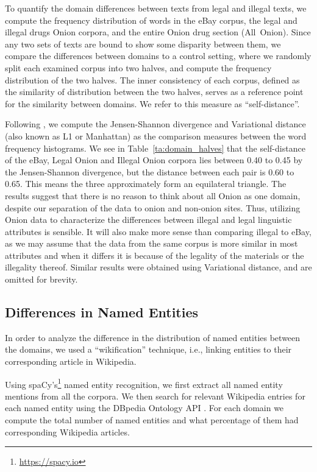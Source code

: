 \documentclass[11pt,a4paper,table]{article}
\begin{document}
    To quantify the domain differences between texts from legal and illegal texts,
    we compute the frequency distribution of words in the eBay corpus, the legal and illegal drugs Onion corpora, and the entire Onion drug section (All~Onion). 
    Since any two sets of texts are bound to show some disparity between them, we compare the differences between domains to a control setting, where we randomly split each examined corpus into two halves, and compute the frequency distribution of the two halves.
    The inner consistency of each corpus, defined as the similarity of distribution between the two halves, serves as a reference point for the similarity between domains.
    We refer to this measure as ``self-distance''.
    
    Following \citet{Plank2011EffectiveMO}, we compute the Jensen-Shannon divergence and Variational distance (also known as L1 or Manhattan) as the comparison measures between the word frequency histograms.
    We see in Table~\ref{ta:domain_halves} that the self-distance of the
    eBay, Legal Onion and Illegal Onion corpora lies between 0.40 to 0.45
    by the Jensen-Shannon divergence, but the distance between each pair
    is 0.60 to 0.65. 
    This means the three approximately form an equilateral triangle. 
    The results suggest that there is no reason to think about all Onion as one domain, despite our separation of the data to onion and non-onion sites. Thus, utilizing Onion data to characterize the differences between illegal and legal linguistic attributes is sensible. It will also make more sense than comparing illegal to eBay, as we may assume that the data from the same corpus is more similar in most attributes and when it differs it is because of the legality of the materials or the illegality thereof.
    Similar results were obtained using Variational distance, and are omitted for brevity.

\subsection{Differences in Named Entities}

    In order to analyze the difference in the distribution of 
    named entities between the domains,  we used a ``wikification''\cite{bunescu2006using} technique, i.e., linking entities to their corresponding article in Wikipedia.

    Using spaCy's\footnote{\url{https://spacy.io}}
    named entity recognition, we first extract all named
    entity mentions from all the corpora. 
    We then search for relevant Wikipedia entries for each named entity using the DBpedia Ontology API \cite{isem2013daiber}.
    For each domain we compute the total number of named entities and what percentage of them had corresponding Wikipedia articles.
\end{document}
